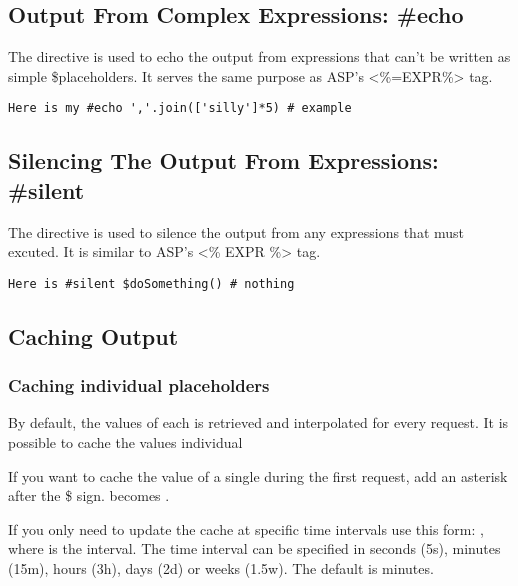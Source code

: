 \subsection{Output From Complex Expressions: \#echo}
\label{output.echo}

The  directive is used to echo the output from expressions that
can't be written as simple \$placeholders.  It serves the same purpose as ASP's
<\%=EXPR\%> tag.

\begin{verbatim}
Here is my #echo ','.join(['silly']*5) # example 
\end{verbatim}


\subsection{Silencing The Output From Expressions: \#silent}
\label{output.silent}

The  directive is used to silence the output from any expressions that
must excuted.  It is similar to ASP's <\% EXPR \%> tag.

\begin{verbatim}
Here is #silent $doSomething() # nothing
\end{verbatim}


\subsection{Caching Output}
\label{output.caching}

\subsubsection{Caching individual placeholders}
\label{output.caching.placeholders}

By default, the values of each  is retrieved and
interpolated for every request. It is possible to cache the values individual
                         
If you want to cache the value of a single  during the first
request, add an asterisk after the \$ sign.   becomes .

If you only need to update the cache at specific time intervals use this form:
 , where  is the interval.  The
time interval can be specified in seconds (5s), minutes (15m), hours (3h), days
(2d) or weeks (1.5w). The default is minutes.

